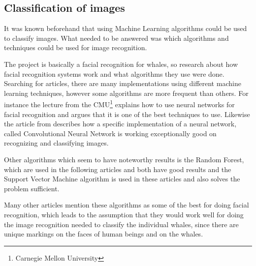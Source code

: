 \subsection{Classification of images}
It was known beforehand that using Machine Learning algorithms could be used to classify images. What needed to be answered was which algorithms and techniques could be used for image recognition. 

The project is basically a facial recognition for whales, so research about how facial recognition systems work and what algorithms they use were done. Searching for articles, there are many implementations using different machine learning techniques, however some algorithms are more frequent than others. For instance the lecture from the CMU\footnote{Carnegie Mellon University} \cite{lit:nn1} explains how to use neural networks for facial recognition and argues that it is one of the best techniques to use. Likewise the article from \cite{lit:nn2} describes how a specific implementation of a neural network, called Convolutional Neural Network is working exceptionally good on recognizing and classifying images. 

Other algorithms which seem to have noteworthy results is the Random Forest, which are used in the following articles \cite{lit:rn1} and \cite{lit:rn2} both have good results and the Support Vector Machine algorithm is used in these articles \cite{lit:svm1} and \cite{lit:svm2} also solves the problem sufficient.

Many other articles mention these algorithms as some of the best for doing facial recognition, which leads to the assumption that they would work well for doing the image recognition needed to classify the individual whales, since there are unique markings on the faces of human beings and on the whales.





